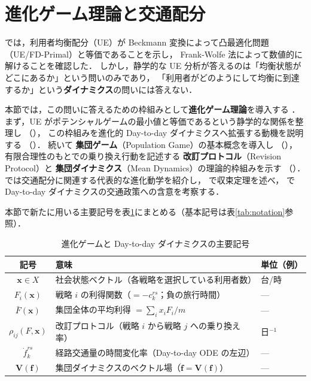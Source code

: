 
\section{進化ゲーム理論と交通配分}
\label{sec:ch7-evogame}

では，利用者均衡配分（UE）が
Beckmann 変換によって凸最適化問題（UE/FD-Primal）と等価であることを示し，
Frank-Wolfe 法によって数値的に解けることを確認した\cite{Beckmann1956,Wardrop1952}．
しかし，静学的な UE 分析が答えるのは「均衡状態がどこにあるか」という問いのみであり，
「利用者がどのようにして均衡に到達するか」という\textbf{ダイナミクス}の問いには答えない．

本節では，この問いに答えるための枠組みとして\textbf{進化ゲーム理論}を導入する
\cite{Sandholm2010,Sandholm2001}．
まず，UE がポテンシャルゲームの最小値と等価であるという静学的な関係を整理し
（），
この枠組みを進化的 Day-to-day ダイナミクスへ拡張する動機を説明する
（）．
続いて \textbf{集団ゲーム}（Population Game）の基本概念を導入し
（），
有限合理性のもとでの乗り換え行動を記述する
\textbf{改訂プロトコル}（Revision Protocol）と
\textbf{集団ダイナミクス}（Mean Dynamics）の理論的枠組みを示す
（）．
 では交通配分に関連する代表的な進化動学を紹介し，
 で収束定理を述べ，
 で Day-to-day ダイナミクスの交通政策への含意を考察する．

本節で新たに用いる主要記号を表\ref{tab:ch7-notation}にまとめる（基本記号は表\ref{tab:notation}参照）．

\begin{table}[hbtp]
  \centering
  \caption{進化ゲームと Day-to-day ダイナミクスの主要記号}
  \label{tab:ch7-notation}
  \begin{tabular}{cll}
    \toprule
    記号 & 意味 & 単位（例） \\
    \midrule
    $\boldsymbol{x} \in X$ & 社会状態ベクトル（各戦略を選択している利用者数） & 台/時 \\
    $F_i(\boldsymbol{x})$  & 戦略 $i$ の利得関数（$= -c_k^{rs}$；負の旅行時間） & — \\
    $\bar{F}(\boldsymbol{x})$ & 集団全体の平均利得 $= \sum_i x_i F_i / m$ & — \\
    $\rho_{ij}(F,\boldsymbol{x})$ & 改訂プロトコル（戦略 $i$ から戦略 $j$ への乗り換え率） & 日$^{-1}$ \\
    $\dot{f}_k^{rs}$       & 経路交通量の時間変化率（Day-to-day ODE の左辺） & — \\
    $\boldsymbol{V}(\boldsymbol{f})$ & 集団ダイナミクスのベクトル場（$\dot{\boldsymbol{f}} = \boldsymbol{V}(\boldsymbol{f})$） & — \\
    \bottomrule
  \end{tabular}
\end{table}

